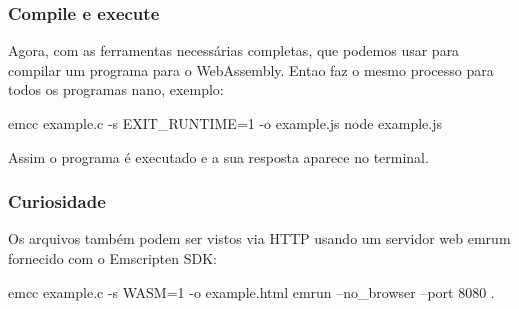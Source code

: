 \documentclass[12pt,a4paper,twoside]{article}
\begin{document}
\subsubsection{Compile e execute}
Agora, com as ferramentas necessárias completas, que podemos usar para compilar um programa para o WebAssembly. Entao faz o mesmo processo para todos os programas nano, exemplo: 
\begin{terminal}
    emcc example.c -s EXIT_RUNTIME=1 -o example.js
    node example.js
\end{terminal}
Assim o programa é executado e a sua resposta aparece no terminal.

\subsubsection{Curiosidade}
Os arquivos também podem ser vistos via HTTP usando um servidor web emrum fornecido com o Emscripten SDK:
\begin{terminal}
    emcc example.c -s WASM=1 -o example.html
    emrun --no_browser --port 8080 .
\end{terminal}
\end{document}
